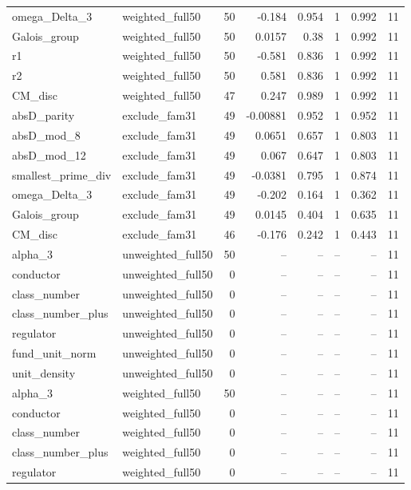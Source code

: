 \begin{tabular}{llrrrrrr}
omega\_Delta\_3 & weighted\_full50 & 50 & -0.184 & 0.954 & 1 & 0.992 & 11 \\
Galois\_group & weighted\_full50 & 50 & 0.0157 & 0.38 & 1 & 0.992 & 11 \\
r1 & weighted\_full50 & 50 & -0.581 & 0.836 & 1 & 0.992 & 11 \\
r2 & weighted\_full50 & 50 & 0.581 & 0.836 & 1 & 0.992 & 11 \\
CM\_disc & weighted\_full50 & 47 & 0.247 & 0.989 & 1 & 0.992 & 11 \\
absD\_parity & exclude\_fam31 & 49 & -0.00881 & 0.952 & 1 & 0.952 & 11 \\
absD\_mod\_8 & exclude\_fam31 & 49 & 0.0651 & 0.657 & 1 & 0.803 & 11 \\
absD\_mod\_12 & exclude\_fam31 & 49 & 0.067 & 0.647 & 1 & 0.803 & 11 \\
smallest\_prime\_div & exclude\_fam31 & 49 & -0.0381 & 0.795 & 1 & 0.874 & 11 \\
omega\_Delta\_3 & exclude\_fam31 & 49 & -0.202 & 0.164 & 1 & 0.362 & 11 \\
Galois\_group & exclude\_fam31 & 49 & 0.0145 & 0.404 & 1 & 0.635 & 11 \\
CM\_disc & exclude\_fam31 & 46 & -0.176 & 0.242 & 1 & 0.443 & 11 \\
alpha\_3 & unweighted\_full50 & 50 & -- & -- & -- & -- & 11 \\
conductor & unweighted\_full50 & 0 & -- & -- & -- & -- & 11 \\
class\_number & unweighted\_full50 & 0 & -- & -- & -- & -- & 11 \\
class\_number\_plus & unweighted\_full50 & 0 & -- & -- & -- & -- & 11 \\
regulator & unweighted\_full50 & 0 & -- & -- & -- & -- & 11 \\
fund\_unit\_norm & unweighted\_full50 & 0 & -- & -- & -- & -- & 11 \\
unit\_density & unweighted\_full50 & 0 & -- & -- & -- & -- & 11 \\
alpha\_3 & weighted\_full50 & 50 & -- & -- & -- & -- & 11 \\
conductor & weighted\_full50 & 0 & -- & -- & -- & -- & 11 \\
class\_number & weighted\_full50 & 0 & -- & -- & -- & -- & 11 \\
class\_number\_plus & weighted\_full50 & 0 & -- & -- & -- & -- & 11 \\
regulator & weighted\_full50 & 0 & -- & -- & -- & -- & 11 \\

\end{tabular}

